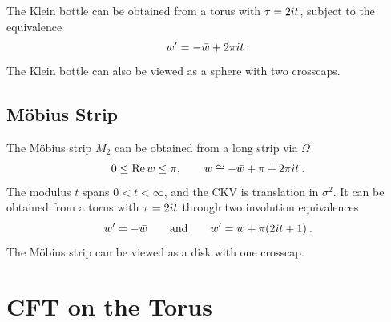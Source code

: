 The Klein bottle can be obtained from a torus with $\tau=2 i t$, subject to the equivalence 
\begin{equation}
	w^{\prime}=-\bar{w}+2 \pi i t \:. \label{7.1.10} 
\end{equation}
The Klein bottle can also be viewed as a sphere with two crosscaps. 

\subsection*{M\"{o}bius Strip} 

The M\"{o}bius strip $M_{2}$ can be obtained from a long strip via $\Omega$ 
\begin{equation}
	0 \leq \operatorname{Re} w \leq \pi, \qquad w \cong-\bar{w}+\pi+2 \pi i t \:. \label{7.1.11} 
\end{equation}
The modulus $t$ spans $0 < t < \infty$, and the CKV is translation in $\sigma^{2}$. 
It can be obtained from a torus with $\tau=2 i t$ through two involution equivalences 
\begin{equation}
	w^{\prime}=-\bar{w} \qquad \text {and} \qquad w^{\prime}=w+\pi(2 i t+1) \:. \label{7.1.12} 
\end{equation}
The M\"{o}bius strip can be viewed as a disk with one crosscap. 

\section{\texorpdfstring{CFT on the Torus}{7.2 CFT on the Torus}} \label{sec:7.2} 

